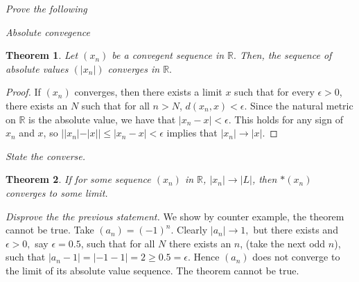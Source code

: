 \documentclass[letter]{article}
\newtheorem{theorem}{Theorem}
\newenvironment{menumerate}{%
  \edef\backupindent{\the\parindent}%
  \enumerate%
  \setlength{\parindent}{\backupindent}%
}{\endenumerate}
\begin{document}
\begin{menumerate}
	 \setcounter{enumi}{7}
	 \item \textit{Prove the following}
	 	\begin{menumerate}
	 	 	\item \textit{Absolute convegence}
	 	 		\begin{theorem}
	 	 		 	Let $(x_n)$ be a convegent sequence in $\mathbb{R}.$ Then, the sequence of absolute values $(|x_n|)$ converges in $\mathbb{R}.$
	 	 		 \end{theorem} 
	 	 		 \begin{proof}
	 	 		 	If $(x_n)$ converges, then there exists a limit $x$ such that for every $\epsilon > 0$, there exists an $N$ such that for all $n > N$, $d(x_n,x) < \epsilon$. Since the natural metric on $\mathbb{R}$ is the absolute value, we have that $|x_n - x| < \epsilon.$ This holds for any sign of $x_n$ and $x$, so $||x_n| - |x||\leq |x_n - x| < \epsilon$ implies that $|x_n| \to |x|.$
	 	 		 \end{proof}
 	 		 \item \textit{State the converse.}
 	 		 	\begin{theorem}
 	 		 	 	If for some sequence $(x_n)$ in $\mathbb{R}$, $|x_n| \to |L|$, then $*(x_n)$ converges to some limit.
 	 		 	 \end{theorem} 
	 		 \item \textit{Disprove the the previous statement. } We show by counter example, the theorem cannot be true. Take $(a_n) = (-1)^n$. Clearly $|a_n| \to 1,$ but there exists and $\epsilon >0, $ say $\epsilon = 0.5$, such that for all $N$ there exists an $n$, (take the next odd $n$), such that $|a_n - 1| = |-1 - 1| = 2 \geq 0.5 = \epsilon.$ Hence $(a_n)$ does not converge to the limit of its absolute value sequence. The theorem cannot be true. 
	 	 \end{menumerate} 


\end{menumerate}
\end{document}

